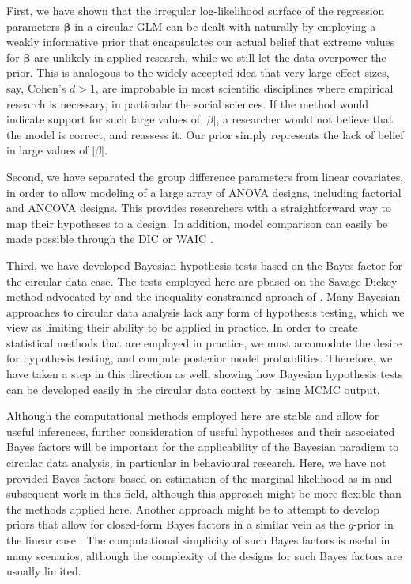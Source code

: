 \documentclass[11pt,a4paper]{article}\usepackage[]{graphicx}\usepackage[]{color}
\newcommand{\bbt}{\boldsymbol{\beta}}
\begin{document}
First, we have shown that the irregular log-likelihood surface of the regression parameters \( \bbt \) in a circular GLM can be dealt with naturally by employing a weakly informative prior that encapsulates our actual belief that extreme values for \( \bbt \) are unlikely in applied research, while we still let the data overpower the prior. This is analogous to the widely accepted idea that very large effect sizes, say, Cohen's \( d > 1 \), are improbable in most scientific disciplines where empirical research is necessary, in particular the social sciences. If the method would indicate support for such large values of \( \vert \beta \vert \), a researcher would not believe that the model is correct, and reassess it. Our prior simply represents the lack of belief in large values of \( \vert \beta \vert.\)

Second, we have separated the group difference parameters from linear covariates, in order to allow modeling of a large array of ANOVA designs, including factorial and ANCOVA designs. This provides researchers with a straightforward way to map their hypotheses to a design. In addition, model comparison can easily be made possible through the DIC or WAIC \citep[Ch. 7]{gelman2003bayesian}.

Third, we have developed Bayesian hypothesis tests based on the Bayes factor for the circular data case. The tests employed here are pbased on the Savage-Dickey method advocated by \citet{wagenmakers2010sdd} and the inequality constrained aproach of \citet{hoijtink2011informative}. Many Bayesian approaches to circular data analysis lack any form of hypothesis testing, which we view as limiting their ability to be applied in practice. In order to create statistical methods that are employed in practice, we must accomodate the desire for hypothesis testing, and compute posterior model probablities. Therefore, we have taken a step in this direction as well, showing how Bayesian hypothesis tests can be developed easily in the circular data context by using MCMC output.

Although the computational methods employed here are stable and allow for useful inferences, further consideration of useful hypotheses and their associated Bayes factors will be important for the applicability of the Bayesian paradigm to circular data analysis, in particular in behavioural research. Here, we have not provided Bayes factors based on estimation of the marginal likelihood as in \citet{chib1995marginal} and subsequent work in this field, although this approach might be more flexible than the methods applied here. Another approach might be to attempt to develop priors that allow for closed-form Bayes factors in a similar vein as the \(g\)-prior in the linear case \citep{zellner1986bayesian, liang2012mixtures}. The computational simplicity of such Bayes factors is useful in many scenarios, although the complexity of the designs for such Bayes factors are usually limited.
\end{document}
